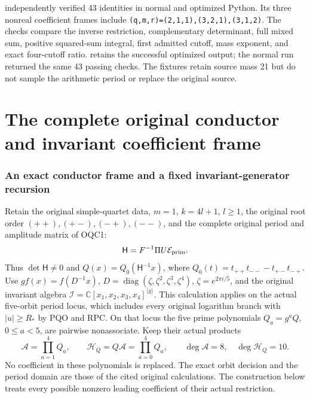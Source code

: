 \documentclass[11pt]{article}
\begin{document}
 independently verified 43 identities in normal and optimized Python. Its three nonreal coefficient frames include \texttt{(q,m,r)=(2,1,1),(3,2,1),(3,1,2)}. The checks compare the inverse restriction, complementary determinant, full mixed sum, positive squared-sum integral, first admitted cutoff, mass exponent, and exact four-cutoff ratio.  retains the successful optimized output; the normal run returned the same 43 passing checks. The fixtures retain source mass 21 but do not sample the arithmetic period or replace the original source.

\endgroup

\clearpage\begingroup
\part*{The complete original conductor and invariant coefficient frame}
\providecommand{\mrocftightlist}{\setlength{\itemsep}{0pt}\setlength{\parskip}{0pt}}

\section{An exact conductor frame and a fixed invariant-generator recursion}
\label{mrocf:sec:OCF}

Retain the original simple-quartet data, $m=1$, $k=4l+1$,
$l\geq1$, the original root order $(++),(+-),(-+),(--)$, and
the complete original period and amplitude matrix of OQC1:
\[
                  \mathsf H=F^{-1}\Pi U\mathcal E_{\rm prim}.
\]
Thus $\det\mathsf H\ne0$ and
$Q(x)=Q_0(\mathsf H^{-1}x)$, where
$Q_0(t)=t_{++}t_{--}-t_{+-}t_{-+}$.
Use $g f(x)=f(D^{-1}x)$,
$D=\operatorname{diag}(\zeta,\zeta^2,\zeta^3,\zeta^4)$,
$\zeta=e^{2\pi i/5}$, and the original invariant algebra
$\mathscr I=\mathbb C[x_1,x_2,x_3,x_4]^{\langle g\rangle}$.
This calculation applies on the actual five-orbit period locus,
which includes every original logarithm branch with $|u|\geq R_*$
by PQO and RPC. On that locus the five prime polynomials
$Q_a=g^aQ$, $0\leq a<5$, are pairwise nonassociate. Keep their
actual products
\[
 \mathcal A=\prod_{a=1}^4Q_a,\qquad
 \mathcal H_Q=Q\mathcal A=\prod_{a=0}^4Q_a,
 \qquad \deg\mathcal A=8,\quad\deg\mathcal H_Q=10.
 \tag{OCF1}
\]
No coefficient in these polynomials is replaced. The exact orbit
decision and the period domain are those of the cited original
calculations. The construction below treats every possible nonzero
leading coefficient of their actual restriction.
\end{document}
